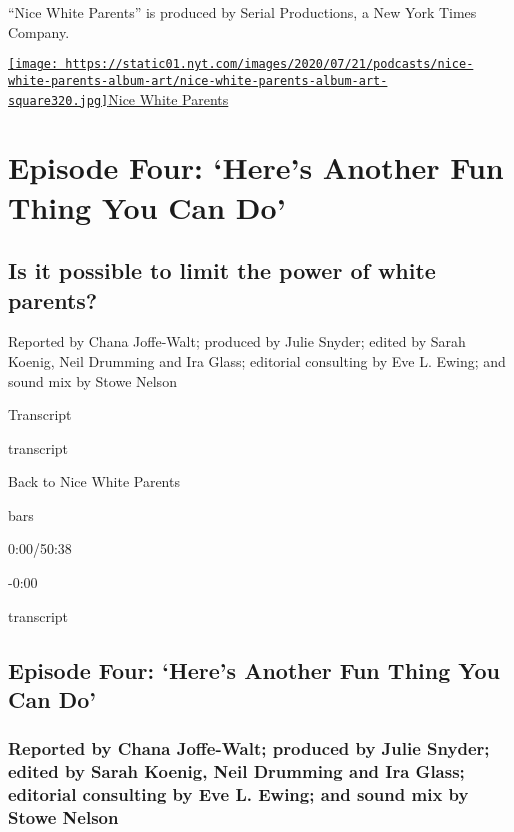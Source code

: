 ``Nice White Parents'' is produced by Serial Productions, a New York
Times Company.

\href{https://www.nytimes.com/column/nice-white-parents}{\texttt{[image: https://static01.nyt.com/images/2020/07/21/podcasts/nice-white-parents-album-art/nice-white-parents-album-art-square320.jpg]}Nice
White Parents}

\hypertarget{episode-four-heres-another-fun-thing-you-can-do-1}{%
\section{Episode Four: `Here's Another Fun Thing You Can
Do'}\label{episode-four-heres-another-fun-thing-you-can-do-1}}

\hypertarget{is-it-possible-to-limit-the-power-of-white-parents-1}{%
\subsection{Is it possible to limit the power of white
parents?}\label{is-it-possible-to-limit-the-power-of-white-parents-1}}

Reported by Chana Joffe-Walt; produced by Julie Snyder; edited by Sarah
Koenig, Neil Drumming and Ira Glass; editorial consulting by Eve L.
Ewing; and sound mix by Stowe Nelson

Transcript

transcript

Back to Nice White Parents

bars

0:00/50:38

-0:00

transcript

\hypertarget{episode-four-heres-another-fun-thing-you-can-do-2}{%
\subsection{Episode Four: `Here's Another Fun Thing You Can
Do'}\label{episode-four-heres-another-fun-thing-you-can-do-2}}

\hypertarget{reported-by-chana-joffe-walt-produced-by-julie-snyder-edited-by-sarah-koenig-neil-drumming-and-ira-glass-editorial-consulting-by-eve-l-ewing-and-sound-mix-by-stowe-nelson-1}{%
\subsubsection{Reported by Chana Joffe-Walt; produced by Julie Snyder;
edited by Sarah Koenig, Neil Drumming and Ira Glass; editorial
consulting by Eve L. Ewing; and sound mix by Stowe
Nelson}\label{reported-by-chana-joffe-walt-produced-by-julie-snyder-edited-by-sarah-koenig-neil-drumming-and-ira-glass-editorial-consulting-by-eve-l-ewing-and-sound-mix-by-stowe-nelson-1}}

